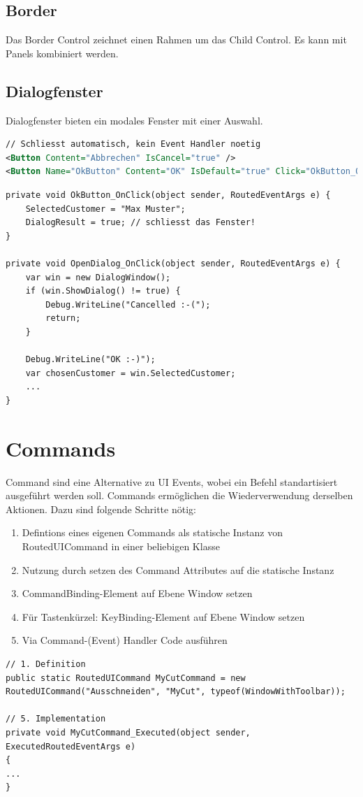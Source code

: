 \subsection{Border}
Das Border Control zeichnet einen Rahmen um das Child Control. Es kann mit Panels kombiniert werden.

\subsection{Dialogfenster}
Dialogfenster bieten ein modales Fenster mit einer Auswahl.
\begin{lstlisting}[caption=Dialog, language=XML]
// Schliesst automatisch, kein Event Handler noetig
<Button Content="Abbrechen" IsCancel="true" />
<Button Name="OkButton" Content="OK" IsDefault="true" Click="OkButton_OnClick" />
\end{lstlisting}

\begin{lstlisting}[caption=Dialog]
private void OkButton_OnClick(object sender, RoutedEventArgs e) {
	SelectedCustomer = "Max Muster";
	DialogResult = true; // schliesst das Fenster!
}

private void OpenDialog_OnClick(object sender, RoutedEventArgs e) {
	var win = new DialogWindow();
	if (win.ShowDialog() != true) {
		Debug.WriteLine("Cancelled :-(");
		return;
	}

	Debug.WriteLine("OK :-)");
	var chosenCustomer = win.SelectedCustomer;
	...
}
\end{lstlisting}

\section{Commands}
Command sind eine Alternative zu UI Events, wobei ein Befehl standartisiert ausgeführt werden soll. Commands ermöglichen die Wiederverwendung derselben Aktionen. Dazu sind folgende Schritte nötig:
\begin{enumerate}
	\item Defintions eines eigenen Commands als statische Instanz von RoutedUICommand in einer beliebigen Klasse
	\item Nutzung durch setzen des Command Attributes auf die statische Instanz
	\item CommandBinding-Element auf Ebene Window setzen
	\item Für Tastenkürzel: KeyBinding-Element auf Ebene Window setzen
	\item Via Command-(Event) Handler Code ausführen
\end{enumerate}
\begin{lstlisting}[caption=Commands]
// 1. Definition
public static RoutedUICommand MyCutCommand = new RoutedUICommand("Ausschneiden", "MyCut", typeof(WindowWithToolbar));

// 5. Implementation
private void MyCutCommand_Executed(object sender, ExecutedRoutedEventArgs e)
{
...
}
\end{lstlisting}

